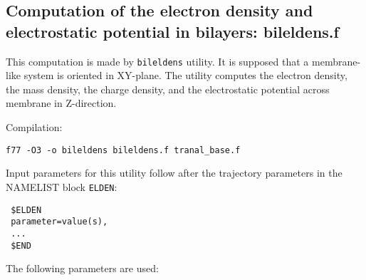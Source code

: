 \documentclass{article}
\begin{document}
\subsection{Computation of the electron density and electrostatic potential 
in bilayers: bileldens.f}

This computation is made by \verb|bileldens| utility. It is supposed
that a membrane-like system is oriented in XY-plane. The utility computes
the electron density, the mass density, the charge density, and the 
electrostatic potential across membrane in Z-direction.

Compilation:

\verb|f77 -O3 -o bileldens bileldens.f tranal_base.f|

Input parameters for this utility follow after the trajectory parameters
in the NAMELIST block \verb|ELDEN|:

\begin{verbatim}
 $ELDEN
 parameter=value(s),
 ...
 $END
\end{verbatim}

The following parameters are used:
\end{document}

